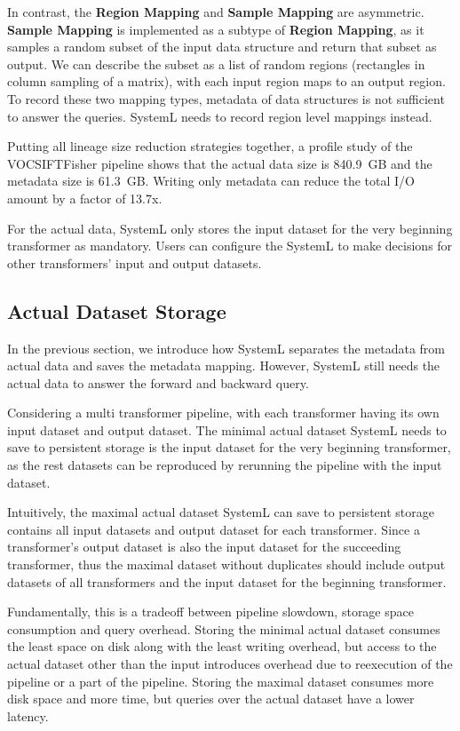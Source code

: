 \documentclass{sig-alternate}
\begin{document}
In contrast, the {\bf Region Mapping} and {\bf Sample Mapping} are asymmetric. 
{\bf Sample Mapping} is implemented as a subtype of {\bf Region Mapping}, as it samples a random subset of the input data structure and return that subset as output.
We can describe the subset as a list of random regions (rectangles in column sampling of a matrix), with each input region maps to an output region.
To record these two mapping types, metadata of data structures is not sufficient to answer the queries. 
SystemL needs to record region level mappings instead.

Putting all lineage size reduction strategies together, 
a profile study of the VOCSIFTFisher pipeline shows that the actual data size is 840.9~GB and the metadata size is 61.3~GB. 
Writing only metadata can reduce the total I/O amount by a factor of 13.7x.

For the actual data, SystemL only stores the input dataset for the very beginning transformer as mandatory. 
Users can configure the SystemL to make decisions for other transformers' input and output datasets.




\subsection{Actual Dataset Storage}
In the previous section, we introduce how SystemL separates the metadata from actual data and saves the metadata mapping.
However, SystemL still needs the actual data to answer the forward and backward query.

Considering a multi transformer pipeline, with each transformer having its own input dataset and output dataset.
The minimal actual dataset SystemL needs to save to persistent storage is the input dataset for the very beginning transformer, as
the rest datasets can be reproduced by rerunning the pipeline with the input dataset.

Intuitively, the maximal actual dataset SystemL can save to persistent storage contains all input datasets and output dataset for each transformer.
Since a transformer's output dataset is also the input dataset for the succeeding transformer, thus the maximal dataset without duplicates
should include output datasets of all transformers and the input dataset for the beginning transformer. 

Fundamentally, this is a tradeoff between pipeline slowdown, storage space consumption and query overhead. 
Storing the minimal actual dataset consumes the least space on disk along with the least writing overhead, 
but access to the actual dataset other than the input introduces overhead due to reexecution of the pipeline or a part of the pipeline.
Storing the maximal dataset consumes more disk space and more time, but queries over the actual dataset
have a lower latency.
\end{document}
